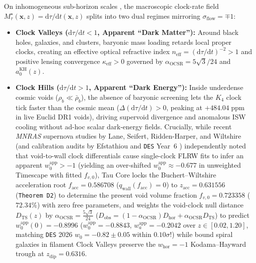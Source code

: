 \documentclass[11pt,a4paper]{article}
\theoremstyle{remark}
\begin{document}
On inhomogeneous sub-horizon scales \cite{JolcsakTauPaper20Euclid2026}, the macroscopic clock-rate field $M_\tau^\star(\mathbf{x}, z) = \mathrm{d}\tau/\mathrm{d}t(\mathbf{x}, z)$ splits into two dual regimes mirroring $\sigma_{\mathrm{flow}} = \mp 1$:
\begin{itemize}
  \item \textbf{Clock Valleys ($\mathrm{d}\tau/\mathrm{d}t < 1$, Apparent ``Dark Matter''):} Around black holes, galaxies, and clusters, baryonic mass loading retards local proper clocks, creating an effective optical refractive index $n_{\mathrm{eff}} = (\mathrm{d}\tau/\mathrm{d}t)^{-2} > 1$ and positive lensing convergence $\kappa_{\mathrm{eff}} > 0$ governed by $\alpha_{\mathrm{OCSR}} = 5\sqrt{3}/24$ and $a_0^{\mathrm{KH}}(z)$.
  \item \textbf{Clock Hills ($\mathrm{d}\tau/\mathrm{d}t > 1$, Apparent ``Dark Energy''):} Inside underdense cosmic voids ($\rho_b \ll \bar{\rho}_b$), the absence of baryonic screening lets the $K_4$ clock tick faster than the cosmic mean ($\Delta(\mathrm{d}\tau/\mathrm{d}t) > 0$, peaking at $+484.04\;\mathrm{ppm}$ in live Euclid DR1 voids), driving supervoid divergence and anomalous ISW cooling without ad-hoc scalar dark-energy fields. Crucially, while recent \textit{MNRAS} supernova studies by Lane, Seifert, Ridden-Harper, and Wiltshire \cite{LaneWiltshire2025MNRAS,SeifertWiltshire2025MNRAS} (and calibration audits by Efstathiou \cite{Efstathiou2025SN} and \texttt{DES} Year~6 \cite{DES2026DynDE}) independently noted that void-to-wall clock differentials cause single-clock FLRW fits to infer an apparent $w_0^{\mathrm{app}} > -1$ (yielding an over-shifted $w_0^{\mathrm{app}} \approx -0.677$ in unweighted Timescape with fitted $f_{v,0}$), Tau Core locks the Buchert--Wiltshire acceleration root $f_{\mathrm{acc}} = 0.586708$ ($q_{\mathrm{wall}}(f_{\mathrm{acc}}) = 0$) to $z_{\mathrm{acc}} = 0.631556$ (\texttt{Theorem D2}) to determine the present void volume fraction $f_{v,0} = \mathbf{0.723358}$ ($72.34\%$) with zero free parameters, and weights the void-clock null distance $D_{\mathrm{TS}}(z)$ by $\alpha_{\mathrm{OCSR}} = \frac{5\sqrt{3}}{24}$ ($D_{\mathrm{obs}} = (1-\alpha_{\mathrm{OCSR}})D_{\mathrm{hor}} + \alpha_{\mathrm{OCSR}}D_{\mathrm{TS}}$) to predict $w_0^{\mathrm{app}}(0) = \mathbf{-0.8996}$ ($w_0^{\mathrm{app}} = \mathbf{-0.8843}$, $w_a^{\mathrm{app}} = -0.2042$ over $z \in [0.02,1.20]$, matching \texttt{DES} 2026 $w_0 = -0.82 \pm 0.05$ within $0.10\sigma$!) while bound spiral galaxies in filament Clock Valleys preserve the $w_{\mathrm{hor}} = -1$ Kodama--Hayward trough at $z_{\mathrm{dip}} = 0.6316$.
\end{itemize}
\end{document}
